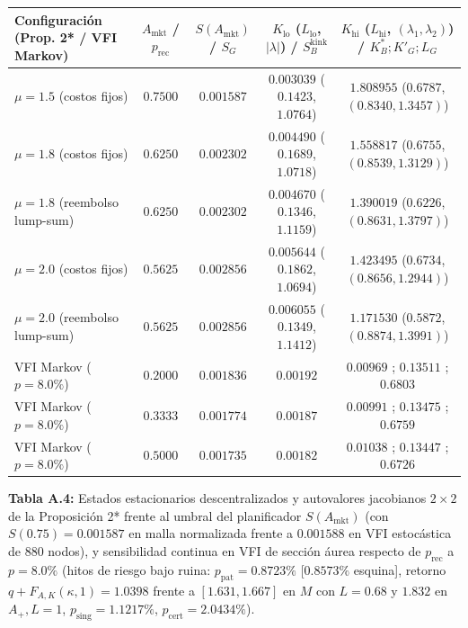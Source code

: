 \documentclass[11pt,letterpaper]{article}
\theoremstyle{plain}
\begin{document}
\begin{table}[htbp]
\centering
\scriptsize
\setlength{\tabcolsep}{3.2pt}
\begin{tabular}{@{}lcccc@{}}
\toprule
\textbf{Configuración (Prop. 2* / VFI Markov)} & $A_{\mathrm{mkt}}$ / $p_{\mathrm{rec}}$ & $S(A_{\mathrm{mkt}})$ / $S_G$ & $K_{\mathrm{lo}}$ ($L_{\mathrm{lo}}$, $|\lambda|$) / $S_B^{\mathrm{kink}}$ & $K_{\mathrm{hi}}$ ($L_{\mathrm{hi}}$, $(\lambda_1,\lambda_2)$) / $K_B^*; K'_G; L_G$ \\
\midrule
$\mu=1.5$ (costos fijos) & $0.7500$ & $0.001587$ & $0.003039$ ($0.1423$, $1.0764$) & $1.808955$ ($0.6787$, $(0.8340, 1.3457)$) \\
$\mu=1.8$ (costos fijos) & $0.6250$ & $0.002302$ & $0.004490$ ($0.1689$, $1.0718$) & $1.558817$ ($0.6755$, $(0.8539, 1.3129)$) \\
$\mu=1.8$ (reembolso lump-sum) & $0.6250$ & $0.002302$ & $0.004670$ ($0.1346$, $1.1159$) & $1.390019$ ($0.6226$, $(0.8631, 1.3797)$) \\
$\mu=2.0$ (costos fijos) & $0.5625$ & $0.002856$ & $0.005644$ ($0.1862$, $1.0694$) & $1.423495$ ($0.6734$, $(0.8656, 1.2944)$) \\
$\mu=2.0$ (reembolso lump-sum) & $0.5625$ & $0.002856$ & $0.006055$ ($0.1349$, $1.1412$) & $1.171530$ ($0.5872$, $(0.8874, 1.3991)$) \\
\midrule
VFI Markov ($p=8.0\%$) & $0.2000$ & $0.001836$ & $0.00192$ & $0.00969$ ; $0.13511$ ; $0.6803$ \\
VFI Markov ($p=8.0\%$) & $0.3333$ & $0.001774$ & $0.00187$ & $0.00991$ ; $0.13475$ ; $0.6759$ \\
VFI Markov ($p=8.0\%$) & $0.5000$ & $0.001735$ & $0.00182$ & $0.01038$ ; $0.13447$ ; $0.6726$ \\
\bottomrule
\end{tabular}
\par\vspace{0.45em}
\begin{minipage}{0.95\linewidth}\centering\footnotesize
\textbf{Tabla A.4:} Estados estacionarios descentralizados y autovalores jacobianos $2\times 2$ de la Proposición 2* frente al umbral del planificador $S(A_{\mathrm{mkt}})$ (con $S(0.75)=0.001587$ en malla normalizada frente a $0.001588$ en VFI estocástica de $880$ nodos), y sensibilidad continua en VFI de sección áurea respecto de $p_{\mathrm{rec}}$ a $p=8.0\%$ (hitos de riesgo bajo ruina: $p_{\mathrm{pat}}=0.8723\%$ [$0.8573\%$ esquina], retorno $q+F_{A,K}(\kappa,1)=1.0398$ frente a $[1.631,1.667]$ en $M$ con $L=0.68$ y $1.832$ en $A_+,L=1$, $p_{\mathrm{sing}}=1.1217\%$, $p_{\mathrm{cert}}=2.0434\%$).
\end{minipage}
\end{table}
\end{document}
